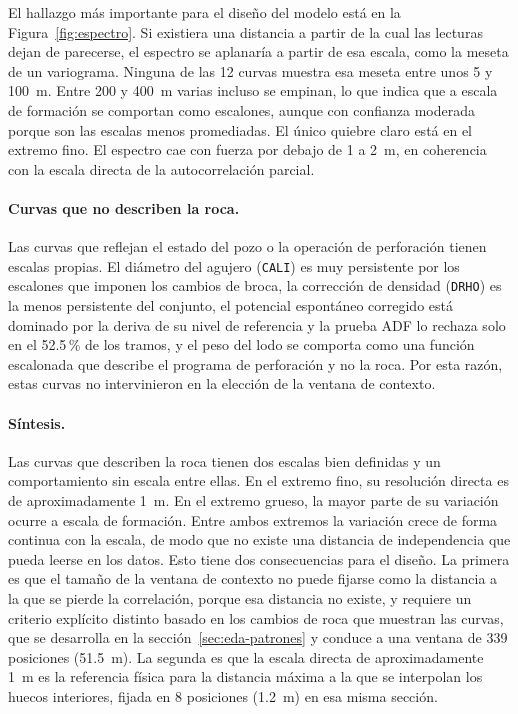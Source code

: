 \documentclass[11pt,a4paper]{article}
\begin{document}
El hallazgo más importante para el diseño del modelo está en la Figura~\ref{fig:espectro}. Si existiera una distancia a partir de la cual las lecturas dejan de parecerse, el espectro se aplanaría a partir de esa escala, como la meseta de un variograma. Ninguna de las 12 curvas muestra esa meseta entre unos 5 y 100~m. Entre 200 y 400~m varias incluso se empinan, lo que indica que a escala de formación se comportan como escalones, aunque con confianza moderada porque son las escalas menos promediadas. El único quiebre claro está en el extremo fino. El espectro cae con fuerza por debajo de 1 a 2~m, en coherencia con la escala directa de la autocorrelación parcial.

\paragraph{Curvas que no describen la roca.} Las curvas que reflejan el estado del pozo o la operación de perforación tienen escalas propias. El diámetro del agujero (\texttt{CALI}) es muy persistente por los escalones que imponen los cambios de broca, la corrección de densidad (\texttt{DRHO}) es la menos persistente del conjunto, el potencial espontáneo corregido está dominado por la deriva de su nivel de referencia y la prueba ADF lo rechaza solo en el 52.5\,\% de los tramos, y el peso del lodo se comporta como una función escalonada que describe el programa de perforación y no la roca. Por esta razón, estas curvas no intervinieron en la elección de la ventana de contexto.

\paragraph{Síntesis.} Las curvas que describen la roca tienen dos escalas bien definidas y un comportamiento sin escala entre ellas. En el extremo fino, su resolución directa es de aproximadamente 1~m. En el extremo grueso, la mayor parte de su variación ocurre a escala de formación. Entre ambos extremos la variación crece de forma continua con la escala, de modo que no existe una distancia de independencia que pueda leerse en los datos. Esto tiene dos consecuencias para el diseño. La primera es que el tamaño de la ventana de contexto no puede fijarse como la distancia a la que se pierde la correlación, porque esa distancia no existe, y requiere un criterio explícito distinto basado en los cambios de roca que muestran las curvas, que se desarrolla en la sección~\ref{sec:eda-patrones} y conduce a una ventana de 339 posiciones (51.5~m). La segunda es que la escala directa de aproximadamente 1~m es la referencia física para la distancia máxima a la que se interpolan los huecos interiores, fijada en 8 posiciones (1.2~m) en esa misma sección.
\end{document}
